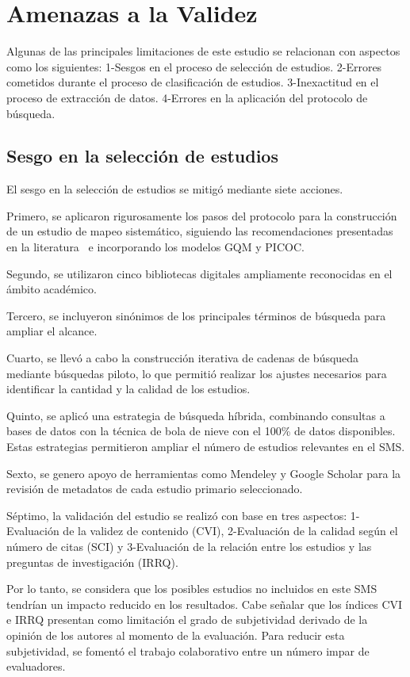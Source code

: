 \section{Amenazas a la Validez}\label{sec:amenazas-validez}

Algunas de las principales limitaciones de este estudio se relacionan con aspectos como los siguientes: 
1-Sesgos en el proceso de selección de estudios. 2-Errores cometidos durante el proceso de clasificación de estudios. 
3-Inexactitud en el proceso de extracción de datos. 4-Errores en la aplicación del protocolo de búsqueda.

\subsection{Sesgo en la selección de estudios}
El sesgo en la selección de estudios se mitigó mediante siete acciones.

Primero, se aplicaron rigurosamente los pasos del protocolo para la construcción de un estudio de mapeo sistemático, siguiendo las 
recomendaciones presentadas en la literatura~\cite{Kitchenham2010} e incorporando los modelos GQM y PICOC.

Segundo, se utilizaron cinco bibliotecas digitales ampliamente reconocidas en el ámbito académico.

Tercero, se incluyeron sinónimos de los principales términos de búsqueda para ampliar el alcance.

Cuarto, se llevó a cabo la construcción iterativa de cadenas de búsqueda mediante búsquedas piloto, lo que permitió realizar los ajustes 
necesarios para identificar la cantidad y la calidad de los estudios.

Quinto, se aplicó una estrategia de búsqueda híbrida, combinando consultas a bases de datos con la técnica de bola de nieve con el 100\% 
de datos disponibles. Estas estrategias permitieron ampliar el número de estudios relevantes en el SMS.

Sexto, se genero apoyo de herramientas como Mendeley y Google Scholar para la revisión de metadatos de cada estudio primario seleccionado.

Séptimo, la validación del estudio se realizó con base en tres aspectos: 1-Evaluación de la validez de contenido (CVI), 2-Evaluación de la 
calidad según el número de citas (SCI) y 3-Evaluación de la relación entre los estudios y las preguntas de investigación (IRRQ).

Por lo tanto, se considera que los posibles estudios no incluidos en este SMS tendrían un impacto reducido en los resultados. 
Cabe señalar que los índices CVI e IRRQ presentan como limitación el grado de subjetividad derivado de la opinión de los autores al 
momento de la evaluación. Para reducir esta subjetividad, se fomentó el trabajo colaborativo entre un número impar de evaluadores.

